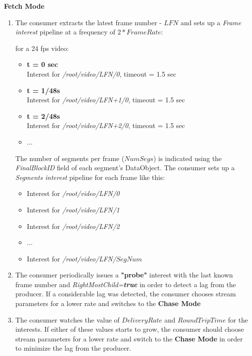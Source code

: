 \documentclass[12pt]{article}
\begin{document}
\textbf{Fetch Mode}
\begin{enumerate}
\item The consumer extracts the latest frame number - $LFN$ and sets up a \textit{Frame interest} pipeline at a frequency of $2*FrameRate$:
\begin{center}
for a 24 fps video:
\begin{itemize}
\item \textbf{t = 0 sec} \\
Interest for \textit{/root/video/LFN/0}, timeout = 1.5 sec
\item \textbf{t = 1/48s} \\
Interest for \textit{/root/video/LFN+1/0}, timeout = 1.5 sec
\item \textbf{t = 2/48s} \\
Interest for \textit{/root/video/LFN+2/0}, timeout = 1.5 sec
\item ...
\end{itemize}
\end{center}

The number of segments per frame ($NumSegs$) is indicated using the \textit{FinalBlockID} field of each segment's DataObject. The consumer sets up a \textit{Segments interest} pipeline for each frame like this: 
\begin{center}
\begin{itemize}
\item Interest for \textit{/root/video/LFN/0}
\item Interest for \textit{/root/video/LFN/1}
\item Interest for \textit{/root/video/LFN/2}
\item ...
\item Interest for \textit{/root/video/LFN/$SegNum$}
\end{itemize}
\end{center}

\item The consumer periodically issues a \textbf{"probe"} interest with the last known frame number and \textit{RightMostChild=\textbf{true}} in order to detect a lag from the producer. If a considerable lag was detected, the consumer chooses stream parameters for a lower rate and switches to the \textbf{Chase Mode}

\item The consumer watches the value of $DeliveryRate$ and $RoundTripTime$ for the interests. If either of these values starts to grow, the consumer should choose stream parameters for a lower rate and switch to the \textbf{Chase Mode} in order to minimize the lag from the producer.

\end{enumerate}
\end{document}
